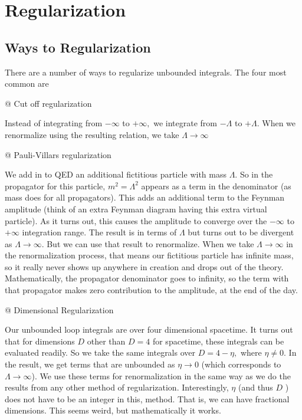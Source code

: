 \chapter{Regularization}
\section{Ways to Regularization}
There are a number of ways to regularize unbounded integrals. The four most common are 
\begin{easylist}
\NewList
@ Cut off regularization

Instead of integrating from $-\infty$ to $+\infty,$ we integrate from $-\Lambda$ to $+\Lambda .$ When we renormalize using the resulting relation, we take $\Lambda \rightarrow \infty$

@ Pauli-Villars regularization

We add in to QED an additional fictitious particle with mass $\Lambda$. So in the propagator for this particle, $m^{2}=\Lambda^{2}$ appears as a term in the denominator (as mass does for all propagators). This adds an additional term to the Feynman amplitude (think of an extra Feynman diagram having this extra virtual particle). As it turns out, this causes the amplitude to converge over the $-\infty$ to $+\infty$ integration range. The result is in terms of $\Lambda$ but turns out to be divergent as $\Lambda \rightarrow \infty$. But we can use that result to renormalize. When we take $\Lambda \rightarrow \infty$ in the renormalization process, that means our fictitious particle has infinite mass, so it really never shows up anywhere in creation and drops out of the theory. Mathematically, the propagator denominator goes to infinity, so the term with that propagator makes zero contribution to the amplitude, at the end of the day.

@ Dimensional Regularization

Our unbounded loop integrals are over four dimensional spacetime. It turns out that for dimensions $D$ other than $D=4$ for spacetime, these integrals can be evaluated readily. So we take the same integrals over $D=4-\eta,$ where $\eta \neq 0 .$ In the result, we get terms that are unbounded as $\eta \rightarrow 0$ (which corresponds to $\Lambda \rightarrow \infty$). We use these terms for renormalization in the same way as we do the results from any other method of regularization. Interestingly, $\eta$ (and thus $D$ ) does not have to be an integer in this, method. That is, we can have fractional dimensions. This seems weird, but mathematically it works.


\end{easylist}
